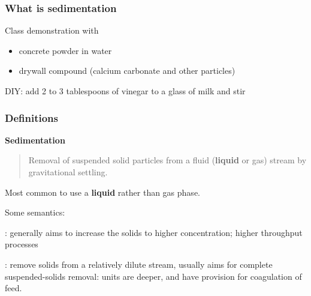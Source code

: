 \begin{comment}
And Perry's section 22.5.7

edimentation Tanks These tanks are an integral part of any activated-sludge system. It is essential to separate the suspended solids from the treated liquid if a high-quality effluent is to be produced. Circular sedimentation tanks with various types of hydraulic sludge collectors have become the standard secondary sedimentation system. Square tanks have been used with commonwall construction for compact design with multiple tanks. Most secondary sedimentation tanks use center-feed inlets and peripheral-weir outlets. Recently, efforts have been made to employ peripheral inlets with submerged-orifice flow controllers and either center-weir outlets or peripheral-weir outlets adjacent to the peripheral-inlet channel.

\end{comment}

\begin{frame}\frametitle{What is sedimentation}
	Class demonstration with
	\begin{itemize}
		\item	concrete powder in water
		\item	drywall compound (calcium carbonate and other particles)
	\end{itemize}

	\vspace{12pt}
	DIY: add 2 to 3 tablespoons of vinegar to a glass of milk and stir	
\end{frame}

\begin{frame}\frametitle{Definitions}	
	\textbf{Sedimentation}
	\begin{quote}	
		Removal of suspended solid particles from a fluid (\textbf{liquid} or gas) stream by gravitational settling.
	\end{quote}
	Most common to use a \textbf{liquid} rather than gas phase.

	\vspace{12pt}
	Some semantics:
	
	\vspace{12pt}	
	{\color{myGreen}{Thickening}}: generally aims to increase the solids to higher concentration; higher throughput processes

	\vspace{12pt}
	{\color{myGreen}{Clarification}}: remove solids from a relatively dilute stream, usually aims for complete suspended-solids removal: units are deeper, and have provision for coagulation of feed.
	
\end{frame}

